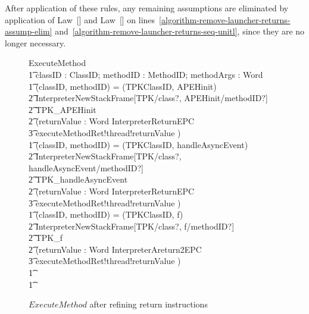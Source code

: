 After application of these rules, any remaining assumptions are
eliminated by application of Law~[] and
Law~[] on
lines~\ref{algorithm-remove-launcher-returns-assump-elim}
and~\ref{algorithm-remove-launcher-returns-seq-unitl}, since they are
no longer necessary.

\begin{figure}[tp!]
  \centering
  \begin{circusaction}
    ExecuteMethod \circdef \\
    \t1 \circval classID : ClassID; \circval methodID : MethodID; \circval methodArgs : \seq Word \circspot \\
    \t1 \circif (classID, methodID) = (TPKClassID, APEHinit) \circthen {} \\
    \t2 InterpreterNewStackFrame[TPK/class?, APEHinit/methodID?] \circseq \\
    \t2 TPK\_APEHinit \circseq \\
    \t2 (\circvar returnValue : Word \circspot \lschexpract InterpreterReturnEPC \rschexpract \circseq \\
    \t3 executeMethodRet!thread!returnValue \then \Skip) \\
    \t1 {} \circelse (classID, methodID) = (TPKClassID, handleAsyncEvent) \circthen {} \\
    \t2 InterpreterNewStackFrame[TPK/class?, handleAsyncEvent/methodID?] \circseq \\
    \t2 TPK\_handleAsyncEvent \circseq \\
    \t2 (\circvar returnValue : Word \circspot \lschexpract InterpreterReturnEPC \rschexpract \circseq \\
    \t3 executeMethodRet!thread!returnValue \then \Skip) \\
    \t1 {} \circelse (classID, methodID) = (TPKClassID, f) \circthen {} \\
    \t2 InterpreterNewStackFrame[TPK/class?, f/methodID?] \circseq \\
    \t2 TPK\_f \circseq \\
    \t2 (\circvar returnValue : Word \circspot \lschexpract InterpreterAreturn2EPC \rschexpract \circseq \\
    \t3 executeMethodRet!thread!returnValue \then \Skip) \\
    \t1 {} \cdots {} \\
    \t1 \circfi
  \end{circusaction}
  \caption{$ExecuteMethod$ after refining return instructions}
  \label{efs-ExecutMethod-refined-return-instructions-figure}
\end{figure}

